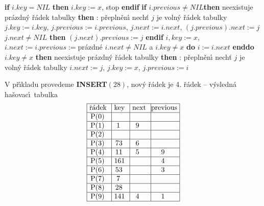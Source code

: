 \documentclass[a4paper,12pt]{article}
\begin{document}
{\bf if} $i.key=NIL$ {\bf then} $i.key:=x$, stop {\bf endif}\newline 
{\bf if} $i.previous\ne NIL${\bf then}\newline 
\phantom{---}{\bf if} neexistuje pr\'azdn\'y \v r\'adek tabulky {\bf then}\newline 
\phantom{------}{\bf V\'ystup}: p\v repln\v en\'\i\newline 
\phantom{---}{\bf else}\newline 
\phantom{------}nech\v t $j$ je voln\'y \v r\'adek tabulky\newline 
\phantom{------}$j.key:=i.key$, $j.previous:=i.previous$, $j.next:=i.next$, $(j.previous).next:=j$\newline 
\phantom{------}{\bf if} $j.next\ne NIL$ {\bf then} $(j.next).previous:=j$ {\bf endif}\newline 
\phantom{---------}$i,key:=x$, $i.next:=i.previous:=$pr\'azdn\'e\newline 
\phantom{------}{\bf endif}\newline 
\phantom{---}{\bf endif\newline 
else}\newline 
\phantom{---}{\bf while} $i.next\ne NIL$ a $i.key\ne x$ {\bf do} $i:=i.next$ {\bf enddo}\newline 
\phantom{---}{\bf if} $i.key\ne x$ {\bf then}\newline 
\phantom{------}{\bf if} neexistuje pr\'azdn\'y \v r\'adek tabulky {\bf then}\newline 
\phantom{---------}{\bf V\'ystup}: p\v repln\v en\'\i\newline 
\phantom{------}{\bf else}\newline 
\phantom{---------}nech\v t $j$ je voln\'y \v r\'adek tabulky\newline 
\phantom{---------}$i.next:=j$, $j.key:=x$, $j.previous:=i$\newline 
\phantom{------}{\bf endif}\newline 
\phantom{---}{\bf endif\newline
endif}
\bigskip

\flushpar V p\v r\'\i kladu provedeme {\bf INSERT$(28)$}, nov\'y \v r\'adek je 4. \v r\'adek\newline 
-- v\'ysledn\'a ha\v sovac\'\i\ tabulka
$$\vtop{\offinterlineskip\halign {\strut\vrule\ # & \vrule\ # & \vrule\ # & \vrule \hfil # \hfil \vrule\cr\noalign{\hrule}\v r\'adek & key & next & previous\hfil \cr\noalign{\hrule}P(0) & & &\hfill \cr\noalign{\hrule}P(1) & 1 & 9 &\hfill \cr\noalign{\hrule}P(2) & & &\hfill \cr\noalign{\hrule}P(3) & 73 & 6 &\hfill \cr\noalign{\hrule}P(4) & 11 & 5 & 9 \cr\noalign{\hrule}P(5) & 161 & & 4 \cr\noalign{\hrule}P(6) & 53 & & 3 \cr\noalign{\hrule}P(7) & 7 & &\hfill \cr\noalign{\hrule}P(8) & 28 &  &\hfill  \cr\noalign{\hrule}P(9) & 141 & 4 & 1 \cr\noalign{\hrule}}}$$
\end{document}
